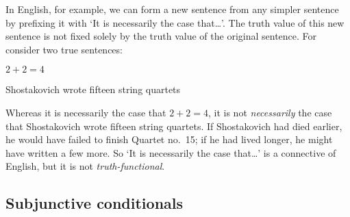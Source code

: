 In English, for example, we can form a new sentence from any simpler sentence by prefixing it with `It is necessarily the case that\ldots'. The truth value of this new sentence is not fixed solely by the truth value of the original sentence. For consider two true sentences:
	\begin{earg}
		\item[\ex{nec-math}] $2 + 2 = 4$
		\item[\ex{nec-music}] Shostakovich wrote fifteen string quartets
	\end{earg}
Whereas it is necessarily the case that $2 + 2 = 4$, it is not \emph{necessarily} the case that Shostakovich wrote fifteen string quartets. If Shostakovich had died earlier, he would have failed to finish Quartet no.\ 15; if he had lived longer, he might have written a few more. So `It is necessarily the case that\ldots' is a connective of English, but it is not \emph{truth-functional}.



\subsection{Subjunctive conditionals}\label{s:IndicativeSubjunctive}
%


